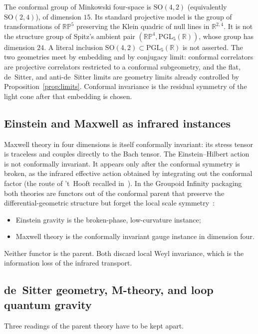 \documentclass{article}
\theoremstyle{definition}
\newcommand{\RP}{\mathbb{RP}}
\newcommand{\R}{\mathbb{R}}
\newcommand{\PGL}{\mathrm{PGL}}
\begin{document}
The conformal group of Minkowski four-space is \(\mathrm{SO}(4,2)\)
(equivalently \(\mathrm{SO}(2,4)\)), of dimension \(15\).  Its standard
projective model is the group of transformations of \(\RP^5\) preserving the
Klein quadric of null lines in \(\R^{2,4}\).  It is not the structure group
of Spitz's ambient pair \((\RP^4,\PGL_5(\R))\), whose group has dimension
\(24\).  A literal inclusion \(\mathrm{SO}(4,2)\subset\PGL_5(\R)\) is not
asserted.  The two geometries meet by embedding and by conjugacy limit:
conformal correlators are projective correlators restricted to a conformal
subgeometry, and the flat, de~Sitter, and anti-de~Sitter limits are geometry
limits already controlled by Proposition~\ref{prop:limits}.  Conformal invariance is the
residual symmetry of the light cone after that embedding is chosen.

\subsection{Einstein and Maxwell as infrared instances}

Maxwell theory in four dimensions is itself conformally invariant: its
stress tensor is traceless and couples directly to the Bach tensor.  The
Einstein--Hilbert action is not conformally invariant.  It appears only after
the conformal symmetry is broken, as the infrared effective action obtained
by integrating out the conformal factor (the route of 't~Hooft recalled
in~\cite{Mannheim2011}).  In the Groupoid Infinity packaging both theories
are functors out of the conformal parent that preserve the differential-geometric
structure but forget the local scale symmetry~\cite{TonpaConf,tHooft}:
\begin{itemize}
  \item Einstein gravity is the broken-phase, low-curvature instance;
  \item Maxwell theory is the conformally invariant gauge instance in
        dimension four.
\end{itemize}
Neither functor is the parent.  Both discard local Weyl invariance, which is
the information loss of the infrared transport.

\subsection{de~Sitter geometry, M-theory, and loop quantum gravity}

Three readings of the parent theory have to be kept apart.
\end{document}
